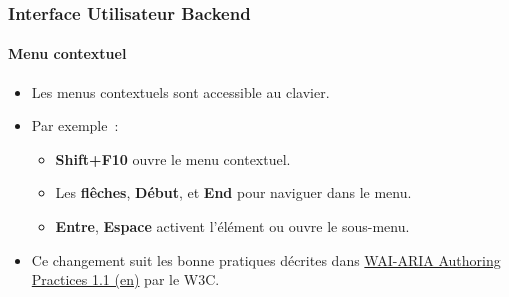 %

\begin{frame}[fragile]
	\frametitle{Interface Utilisateur Backend}
	\framesubtitle{Menu contextuel}

	\begin{itemize}
		\item Les menus contextuels sont accessible au clavier.
		\item Par exemple~:

			\begin{itemize}\small
				\item \textbf{Shift+F10} ouvre le menu contextuel.
				\item Les \textbf{flêches}, \textbf{Début}, et \textbf{End} pour naviguer dans le menu.
				\item \textbf{Entre}, \textbf{Espace} activent l'élément ou ouvre le sous-menu.
			\end{itemize}

		\item Ce changement suit les bonne pratiques décrites dans
			\href{https://www.w3.org/TR/wai-aria-practices-1.1/#keyboard-interaction-12}{WAI-ARIA Authoring Practices 1.1 (en)}
			par le W3C.

	\end{itemize}

\end{frame}

